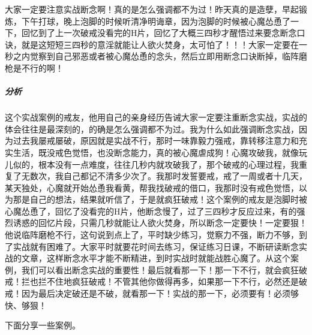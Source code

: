 \begin{case}
    大家一定要注意实战断念啊！真的是怎么强调都不为过！昨天真的是造孽，早起锻炼，下午打球，晚上泡脚的时候听清净明诲章，因为泡脚的时候被心魔怂恿了一下，回忆到了上一次破戒没看完的H片，回忆了大概三四秒才醒悟过来要念断念口诀，就是这短短三四秒的意淫就能让人欲火焚身，太可怕了！！！大家一定要在一秒之内觉察到自己邪恶或者被心魔怂恿的念头，然后立即用断念口诀断掉，临阵磨枪是不行的啊！
    \subparagraph{分析} 这个实战案例的戒友，他用自己的亲身经历告诫大家一定要注重断念实战，实战的体会往往是最深刻的，的确是怎么强调都不为过。我为什么如此强调断念实战，因为过去我屡戒屡破，原因就是实战不行，那时一味靠毅力强戒，靠转移注意力和充实生活，既没戒色觉悟，也没断念能力，真的被心魔虐成狗！心魔攻破我，就像玩儿似的，根本没有一点难度，往往几秒内就攻破我了，那个破戒的心理过程，我重复了无数次，我自己都记不清多少次了。我那时发誓要戒，戒了一周或者十几天，某天独处，心魔就开始怂恿我看黄，帮我找破戒的借口，我那时没有戒色觉悟，以为那是自己的想法，结果就听信了，于是就疯狂破戒！这个案例的戒友是泡脚时被心魔怂恿了，回忆了没看完的H片，他断念慢了，过了三四秒才反应过来，有的强烈诱惑的回忆片段，只需几秒就能让人欲火焚身，所以断念一定要快！一定要狠！他说临阵磨枪不行，这句说到点上了，平时缺少练习，觉察力不强，断力不够，到了实战就有困难了。大家平时就要花时间去练习，保证练习日课，不断研读断念实战的文章，这样断念水平才能不断精进，到时实战时就能战胜心魔了。从这个案例，我们可以看出断念实战的重要性！最后就看那一下！那一下不行，就会疯狂破戒！拦也拦不住地疯狂破戒！不管其他你做得再多，如果那一下不行，必然还是破戒！因为最后决定破还是不破，就看那一下！实战的那一下，必须要有！必须够快、够狠！
\end{case}

下面分享一些案例。

